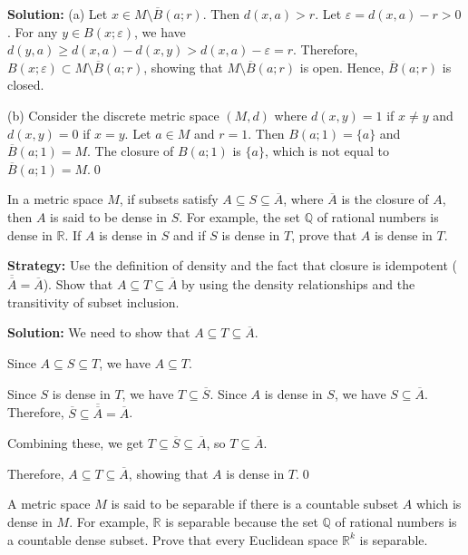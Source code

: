\bigskip\noindent\textbf{Solution:} 
(a) Let $x \in M \setminus \overline{B}(a;r)$. Then $d(x,a) > r$. Let $\varepsilon = d(x,a) - r > 0$. For any $y \in B(x;\varepsilon)$, we have $d(y,a) \geq d(x,a) - d(x,y) > d(x,a) - \varepsilon = r$. Therefore, $B(x;\varepsilon) \subset M \setminus \overline{B}(a;r)$, showing that $M \setminus \overline{B}(a;r)$ is open. Hence, $\overline{B}(a;r)$ is closed.

(b) Consider the discrete metric space $(M,d)$ where $d(x,y) = 1$ if $x \neq y$ and $d(x,y) = 0$ if $x = y$. Let $a \in M$ and $r = 1$. Then $B(a;1) = \{a\}$ and $\overline{B}(a;1) = M$. The closure of $B(a;1)$ is $\{a\}$, which is not equal to $\overline{B}(a;1) = M$.\qed


\begin{problembox}
In a metric space \( M \), if subsets satisfy \( A \subseteq S \subseteq \overline{A} \), where \(\overline{A}\) is the closure of \( A \), then \( A \) is said to be dense in \( S \). For example, the set \( \mathbb{Q} \) of rational numbers is dense in \( \mathbb{R} \). If \( A \) is dense in \( S \) and if \( S \) is dense in \( T \), prove that \( A \) is dense in \( T \).
\end{problembox}

\noindent\textbf{Strategy:} Use the definition of density and the fact that closure is idempotent ($\overline{\overline{A}} = \overline{A}$). Show that $A \subseteq T \subseteq \overline{A}$ by using the density relationships and the transitivity of subset inclusion.

\bigskip\noindent\textbf{Solution:} We need to show that $A \subseteq T \subseteq \overline{A}$.

Since $A \subseteq S \subseteq T$, we have $A \subseteq T$.

Since $S$ is dense in $T$, we have $T \subseteq \overline{S}$. Since $A$ is dense in $S$, we have $S \subseteq \overline{A}$. Therefore, $\overline{S} \subseteq \overline{\overline{A}} = \overline{A}$.

Combining these, we get $T \subseteq \overline{S} \subseteq \overline{A}$, so $T \subseteq \overline{A}$.

Therefore, $A \subseteq T \subseteq \overline{A}$, showing that $A$ is dense in $T$.\qed


\begin{problembox}
A metric space \( M \) is said to be separable if there is a countable subset \( A \) which is dense in \( M \). For example, \( \mathbb{R} \) is separable because the set \( \mathbb{Q} \) of rational numbers is a countable dense subset. Prove that every Euclidean space \( \mathbb{R}^k \) is separable.
\end{problembox}

